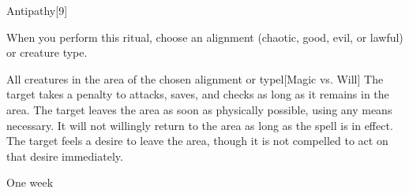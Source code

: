 \begin{spellsection}{Antipathy}[9]
    \begin{spellheader}
    \end{spellheader}
    \begin{spellcontent}
        \begin{spelltargetinginfo}
        \end{spelltargetinginfo}
        \begin{spelleffects}

            \spellspecial When you perform this ritual, choose an alignment (chaotic, good, evil, or lawful) or creature type.
            \begin{spelltargets}{All creatures in the area of the chosen alignment or type}l[Magic vs. Will]
                \spelleffect The target takes a  penalty to attacks, saves, and checks as long as it remains in the area.
                \spellsuccess The target leaves the area as soon as physically possible, using any means necessary. It will not willingly return to the area as long as the spell is in effect.
                \spellfailure The target feels a desire to leave the area, though it is not compelled to act on that desire immediately.
            \end{spelltargets}
            \spelldur One week \dismissable
        \end{spelleffects}
    \end{spellcontent}
    \begin{spellfooter}
    \end{spellfooter}
\end{spellsection}

